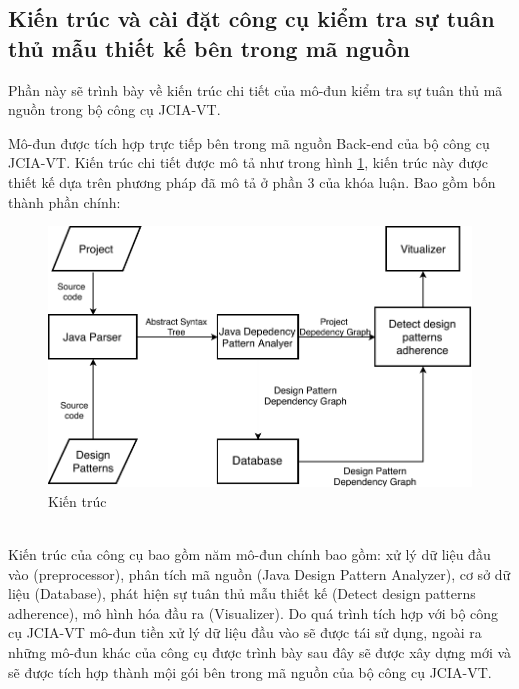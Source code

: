 \documentclass[12pt]{report}
\begin{document}
\subsection{Kiến trúc và cài đặt công cụ kiểm tra sự tuân thủ mẫu thiết kế bên trong mã nguồn}
Phần này sẽ trình bày về kiến trúc chi tiết của mô-đun kiểm tra sự tuân thủ mã nguồn trong bộ công cụ JCIA-VT.

\noindent Mô-đun được tích hợp trực tiếp bên trong mã nguồn Back-end của bộ công cụ JCIA-VT. Kiến trúc chi tiết được mô tả như trong hình \ref{fig:detect_design_pattern_architexture}, kiến trúc này được thiết kế dựa trên phương pháp đã mô tả ở phần 3 của khóa luận. Bao gồm bốn thành phần chính:
\begin{figure}[!htbp]
	\centering
	\includegraphics[scale=1]{images/c4_architexture.pdf}
	\caption{Kiến trúc }
	\label{fig:detect_design_pattern_architexture}
\end{figure}\\
Kiến trúc của công cụ bao gồm năm mô-đun chính bao gồm: xử lý dữ liệu đầu vào (preprocessor), phân tích mã nguồn (Java Design Pattern Analyzer), cơ sở dữ liệu (Database), phát hiện sự tuân thủ mẫu thiết kế (Detect design patterns adherence), mô hình hóa đầu ra (Visualizer). Do quá trình tích hợp với bộ công cụ JCIA-VT mô-đun tiền xử lý dữ liệu đầu vào sẽ được tái sử dụng, ngoài ra những mô-đun khác của công cụ được trình bày sau đây sẽ được xây dựng mới và sẽ được tích hợp thành mội gói bên trong mã nguồn của bộ công cụ  JCIA-VT.
\end{document}
